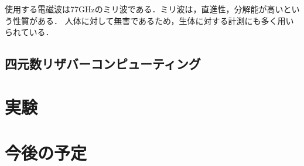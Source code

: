 \documentclass[uplatex,a4paper,10pt]{jsarticle}
\begin{document}
使用する電磁波は77GHzのミリ波である．ミリ波は，直進性，分解能が高いという性質がある．
人体に対して無害であるため，生体に対する計測にも多く用いられている．

\subsection{四元数リザバーコンピューティング}



\section{実験}


\section{今後の予定}
\end{document}
